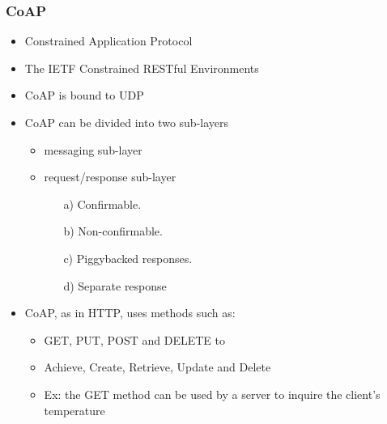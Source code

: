 \subsubsection{CoAP}
\begin{itemize}
	\item Constrained Application Protocol
	\item The IETF Constrained RESTful Environments
	\item CoAP is bound to UDP
	\item CoAP can be divided into two sub-layers
		\begin{itemize}
			\item messaging sub-layer
			\item request/response sub-layer
			\begin{itemize}
				\item[a)] Confirmable. 
				\item[b)] Non-confirmable. 
				\item[c)] Piggybacked responses. 
				\item[d)] Separate response
			\end{itemize}
		\end{itemize}
	\item CoAP, as in HTTP, uses methods such as:
	\begin{itemize}
		\item GET, PUT, POST and DELETE to 
		\item Achieve, Create, Retrieve, Update and Delete
	\end{itemize}
	\begin{itemize}
		\item Ex: the GET method can be used by a server to inquire the client’s temperature
	\end{itemize}
\end{itemize}

